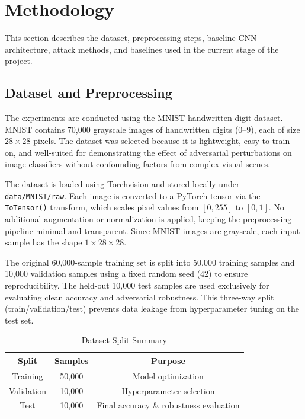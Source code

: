 \documentclass[conference]{IEEEtran}
\begin{document}
\section{Methodology}

This section describes the dataset, preprocessing steps, baseline CNN architecture, attack methods, and baselines used in the current stage of the project.

\subsection{Dataset and Preprocessing}

The experiments are conducted using the MNIST handwritten digit dataset. MNIST contains 70,000 grayscale images of handwritten digits (0--9), each of size $28 \times 28$ pixels. The dataset was selected because it is lightweight, easy to train on, and well-suited for demonstrating the effect of adversarial perturbations on image classifiers without confounding factors from complex visual scenes.

The dataset is loaded using Torchvision and stored locally under \texttt{data/MNIST/raw}. Each image is converted to a PyTorch tensor via the \texttt{ToTensor()} transform, which scales pixel values from $[0, 255]$ to $[0, 1]$. No additional augmentation or normalization is applied, keeping the preprocessing pipeline minimal and transparent. Since MNIST images are grayscale, each input sample has the shape $1 \times 28 \times 28$.

The original 60,000-sample training set is split into 50,000 training samples and 10,000 validation samples using a fixed random seed (42) to ensure reproducibility. The held-out 10,000 test samples are used exclusively for evaluating clean accuracy and adversarial robustness. This three-way split (train/validation/test) prevents data leakage from hyperparameter tuning on the test set.

\begin{table}[htbp]
\caption{Dataset Split Summary}
\begin{center}
\begin{tabular}{|c|c|c|}
\hline
\textbf{Split} & \textbf{Samples} & \textbf{Purpose} \\
\hline
Training & 50,000 & Model optimization \\
\hline
Validation & 10,000 & Hyperparameter selection \\
\hline
Test & 10,000 & Final accuracy \& robustness evaluation \\
\hline
\end{tabular}
\label{tab:data_split}
\end{center}
\end{table}
\end{document}
